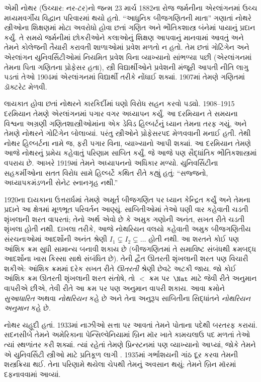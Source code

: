 \label{guunit:OLP-0626}



એમી નોથર (ઉચ્ચાર: નર-ટર)નો જન્મ 23 માર્ચ
1882ના રોજ જર્મનીના એરલાંગનમાં ઉચ્ચ
મધ્યમવર્ગીય વિદ્વાન પરિવારમાં થયો હતો.
“આધુનિક બીજગણિતની માતા” ગણાતાં નોથરે
સ્ત્રીઓના શિક્ષણમાં મોટા અવરોધો હોવા છતાં
ગણિત અને ભૌતિકશાસ્ત્ર બંનેમાં પાયાનું
પ્રદાન કર્યું. તે સમયે જર્મનીમાં છોકરીઓને
કલાઓનું શિક્ષણ આપવાનું માનવામાં આવતું અને
તેમને કોલેજની તૈયારી કરાવતી શાળાઓમાં
પ્રવેશ મળતો ન હતો. તેમ છતાં ગોટિંગેન
અને એરલાંગન યુનિવર્સિટીઓમાં નિયમિત
પ્રવેશ વિના વ્યાખ્યાનો સાંભળ્યા પછી
(એરલાંગનમાં તેમના પિતા ગણિતના પ્રોફેસર
હતા), સ્ત્રી વિદ્યાર્થીઓને પ્રવેશની
મંજૂરી આપતી નીતિ લાગુ પડતાં તેઓ
1904માં એરલાંગનમાં વિદ્યાર્થી તરીકે
નોંધાઈ શક્યાં. 1907માં તેમણે ગણિતમાં
ડૉક્ટરેટ મેળવી.

લાયકાત હોવા છતાં નોથરને કારકિર્દીમાં
ઘણો વિરોધ સહન કરવો પડ્યો. 1908--1915
દરમિયાન તેમણે એરલાંગનમાં પગાર વગર
અધ્યાપન કર્યું. આ દરમિયાન તે સમયના
વિશ્વના અગ્રણી ગણિતશાસ્ત્રીઓમાંના
એક ડેવિડ હિલ્બર્ટનું ધ્યાન તેમના
તરફ ગયું, અને તેમણે નોથરને ગોટિંગેન
બોલાવ્યાં. પરંતુ સ્ત્રીઓને પ્રોફેસરપદ
મેળવવાની મનાઈ હતી. તેથી નોથર
હિલ્બર્ટના નામે જ, ફરી પગાર વિના,
વ્યાખ્યાનો આપી શક્યાં. આ દરમિયાન
તેમણે આજે નોથરનું પ્રમેય કહેવાતું
પરિણામ સાબિત કર્યું, જે આજે પણ
સૈદ્ધાંતિક ભૌતિકશાસ્ત્રમાં વપરાય છે.
આખરે 1919માં તેમને અધ્યાપનનો
અધિકાર મળ્યો. યુનિવર્સિટીના
સહકર્મીઓના સતત વિરોધ સામે
હિલ્બર્ટે કથિત રીતે કહ્યું હતું:
“સજ્જનો, અધ્યાપકમંડળની સેનેટ
સ્નાનગૃહ નથી.”

1920ના દાયકાના ઉત્તરાર્ધમાં તેમણે
અમૂર્ત બીજગણિત પર ધ્યાન કેન્દ્રિત
કર્યું અને તેમના પ્રદાને આ ક્ષેત્રમાં
મૂળભૂત પરિવર્તન આણ્યું. સાબિતીઓમાં
તેઓ ઘણી વાર કહેવાતી ચડતી શૃંખલાની
શરત વાપરતાં; તેનો અર્થ એવો છે કે
અમુક ગણોની અનંત, સખત રીતે ચડતી
શૃંખલા હોતી નથી. દાખલા તરીકે,
આજે નોથરિયન વલયો કહેવાતી અમુક
બીજગણિતીય સંરચનાઓમાં આદર્શોની
અનંત શ્રેણી $I_1
\subsetneq I_2 \subsetneq \dots$
હોતી નથી. આ શરતને કોઈ પણ
આંશિક ક્રમ સુધી સામાન્ય બનાવી
શકાય છે (બીજગણિતમાં તે સમાવિષ્ટ
સંબંધથી ક્રમબદ્ધ આદર્શોના ખાસ
કિસ્સા સાથે સંબંધિત છે). તેની
દ્વૈત ઊતરતી શૃંખલાની શરત પણ
વિચારી શકીએ: આંશિક ક્રમમાં દરેક
સખત રીતે \emph{ઊતરતી} શ્રેણી
છેવટે અટકી જાય. જો કોઈ આંશિક
ક્રમ ઊતરતી શૃંખલાની શરત સંતોષે,
તો $<$ ક્રમ પર~$\Nat$ માટે
જેવી રીતે અનુમાન વાપરીએ છીએ,
તેવી રીતે આ ક્રમ પર પણ અનુમાન
વાપરી શકાય. આવા ક્રમોને
\emph{સુઆધારિત} અથવા
\emph{નોથરિયન} કહે છે અને
તેના અનુરૂપ સાબિતીના સિદ્ધાંતને
\emph{નોથરિયન અનુમાન} કહે છે.

નોથર યહૂદી હતાં. 1933માં નાઝીઓ
સત્તા પર આવતાં તેમને પોતાના
પદેથી બરતરફ કરાયાં. સદનસીબે
તેમને અમેરિકાના પેન્સિલ્વેનિયામાં
બ્રિન મૉર ખાતે કામચલાઉ પદ
મળતાં તેઓ ત્યાં સ્થળાંતર કરી
શક્યાં. ત્યાં રહેતાં તેમણે
પ્રિન્સ્ટનમાં પણ વ્યાખ્યાનો આપ્યાં,
જોકે તેમને એ યુનિવર્સિટી
સ્ત્રીઓ માટે પ્રતિકૂળ લાગી
\citep[81]{Dick1981}. 1935માં
ગર્ભાશયની ગાંઠ દૂર કરવા
તેમની શસ્ત્રક્રિયા થઈ. તેના
પરિણામે થયેલા ચેપથી તેમનું
અવસાન થયું; તેમને બ્રિન
મૉરમાં દફનાવવામાં આવ્યાં.

